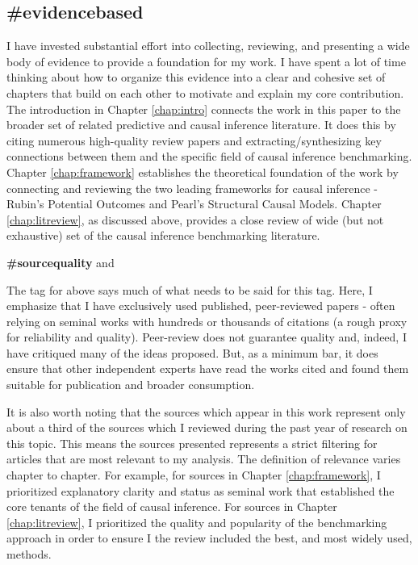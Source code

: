 \documentclass[./main.tex]{subfiles}
\begin{document}

\subsection{\textbf{\#evidencebased}}
\label{hc:evidencebased}

I have invested substantial effort into collecting, reviewing, and presenting a wide body of evidence to provide a foundation for my work. I have spent a lot of time thinking about how to organize this evidence into a clear and cohesive set of chapters that build on each other to motivate and explain my core contribution. The introduction in Chapter \ref{chap:intro} connects the work in this paper to the broader set of related predictive and causal inference literature. It does this by citing numerous high-quality review papers and extracting/synthesizing key connections between them and the specific field of causal inference benchmarking. Chapter \ref{chap:framework} establishes the theoretical foundation of the work by connecting and reviewing the two leading frameworks for causal inference - Rubin's Potential Outcomes and Pearl's Structural Causal Models. Chapter \ref{chap:litreview}, as discussed above, provides a close review of wide (but not exhaustive) set of the causal inference benchmarking literature.


\textbf{\#sourcequality} and 
\label{hc:sourcequality}

The tag for  above says much of what needs to be said for this tag. Here, I emphasize that I have exclusively used published, peer-reviewed papers - often relying on seminal works with hundreds or thousands of citations (a rough proxy for reliability and quality). Peer-review does not guarantee quality and, indeed, I have critiqued many of the ideas proposed. But, as a minimum bar, it does ensure that other independent experts have read the works cited and found them suitable for publication and broader consumption.\par

It is also worth noting that the sources which appear in this work represent only about a third of the sources which I reviewed during the past year of research on this topic. This means the sources presented represents a strict filtering for articles that are most relevant to my analysis. The definition of relevance varies chapter to chapter. For example, for sources in Chapter \ref{chap:framework}, I prioritized explanatory clarity and status as seminal work that established the core tenants of the field of causal inference. For sources in Chapter \ref{chap:litreview}, I prioritized the quality and popularity of the benchmarking approach in order to ensure I the review included the best, and most widely used, methods.
\end{document}
